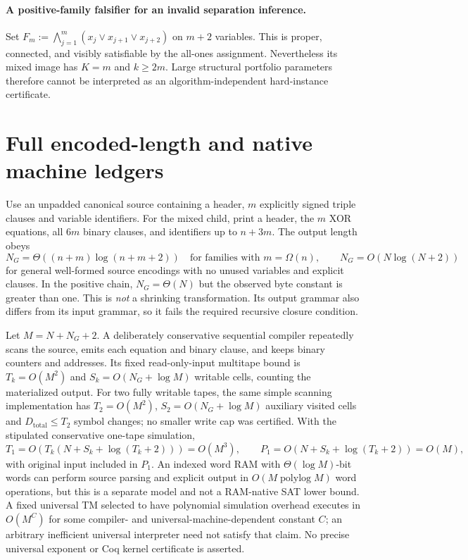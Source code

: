 \documentclass[11pt]{article}
\begin{document}
\paragraph{A positive-family falsifier for an invalid separation inference.}
Set $F_m:=\bigwedge_{j=1}^{m}(x_j\lor x_{j+1}\lor x_{j+2})$ on $m+2$ variables. This is proper, connected, and visibly satisfiable by the all-ones assignment. Nevertheless its mixed image has $K=m$ and $k\ge2m$. Large structural portfolio parameters therefore cannot be interpreted as an algorithm-independent hard-instance certificate.

\section{Full encoded-length and native machine ledgers}
Use an unpadded canonical source containing a header, $m$ explicitly signed triple clauses and variable identifiers. For the mixed child, print a header, the $m$ XOR equations, all $6m$ binary clauses, and identifiers up to $n+3m$. The output length obeys
\[
N_G=\Theta((n+m)\log(n+m+2))\quad\text{for families with }m=\Omega(n),
\qquad N_G=O(N\log(N+2))
\]
for general well-formed source encodings with no unused variables and explicit clauses. In the positive chain, $N_G=\Theta(N)$ but the observed byte constant is greater than one. This is \emph{not} a shrinking transformation. Its output grammar also differs from its input grammar, so it fails the required recursive closure condition.

Let $M=N+N_G+2$. A deliberately conservative sequential compiler repeatedly scans the source, emits each equation and binary clause, and keeps binary counters and addresses. Its fixed read-only-input multitape bound is $T_k=O(M^2)$ and $S_k=O(N_G+\log M)$ writable cells, counting the materialized output. For two fully writable tapes, the same simple scanning implementation has $T_2=O(M^2)$, $S_2=O(N_G+\log M)$ auxiliary visited cells and $D_{\mathrm{total}}\le T_2$ symbol changes; no smaller write cap was certified. With the stipulated conservative one-tape simulation,
\[
T_1=O(T_k(N+S_k+\log(T_k+2)))=O(M^3),\qquad
P_1=O(N+S_k+\log(T_k+2))=O(M),
\]
with original input included in $P_1$. An indexed word RAM with $\Theta(\log M)$-bit words can perform source parsing and explicit output in $O(M\operatorname{polylog} M)$ word operations, but this is a separate model and not a RAM-native SAT lower bound. A fixed universal TM selected to have polynomial simulation overhead executes in $O(M^C)$ for some compiler- and universal-machine-dependent constant $C$; an arbitrary inefficient universal interpreter need not satisfy that claim. No precise universal exponent or Coq kernel certificate is asserted.
\end{document}
